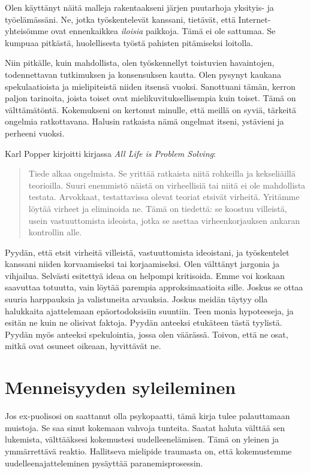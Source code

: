 Olen käyttänyt näitä malleja rakentaakseni järjen puutarhoja yksityis- ja työelämässäni. Ne, jotka työskentelevät kanssani, tietävät, että Internet-yhteisömme ovat ennenkaikkea \emph{iloisia} paikkoja. Tämä ei ole sattumaa. Se kumpuaa pitkästä, huolellisesta työstä pahisten pitämiseksi loitolla.

Niin pitkälle, kuin mahdollista, olen työskennellyt toistuvien havaintojen, todennettavan tutkimuksen ja konsensuksen kautta. Olen pysynyt kaukana spekulaatioista ja mielipiteistä niiden itsensä vuoksi. Sanottuani tämän, kerron paljon tarinoita, joista toiset ovat mielikuvituksellisempia kuin toiset. Tämä on välttämätöntä. Kokemukseni on kertonut minulle, että meillä on syviä, tärkeitä ongelmia ratkottavana. Halusin ratkaista nämä ongelmat itseni, ystävieni ja perheeni vuoksi.

Karl Popper kirjoitti kirjassa \emph{All Life is Problem Solving}:
\begin{quotation}
\noindent Tiede alkaa ongelmista. Se yrittää ratkaista niitä rohkeilla ja kekseliäillä teorioilla. Suuri enemmistö näistä on virheellisiä tai niitä ei ole mahdollista testata. Arvokkaat, testattavissa olevat teoriat etsivät virheitä. Yritämme löytää virheet ja eliminoida ne. Tämä on tiedettä: se koostuu villeistä, usein vastuuttomista ideoista, jotka se asettaa virheenkorjauksen ankaran kontrollin alle.
\end{quotation}
Pyydän, että etsit virheitä villeistä, vastuuttomista ideoistani, ja työskentelet kanssani niiden korvaamiseksi tai korjaamiseksi. Olen välttänyt jargonia ja vihjailua. Selvästi esitettyä ideaa on helpompi kritisoida. Emme voi koskaan saavuttaa totuutta, vain löytää parempia approksimaatioita sille. Joskus se ottaa suuria harppauksia ja valistuneita arvauksia. Joskus meidän täytyy olla halukkaita ajattelemaan epäortodoksisiin suuntiin. Teen monia hypoteeseja, ja esitän ne kuin ne olisivat faktoja. Pyydän anteeksi etukäteen tästä tyylistä. Pyydän myös anteeksi spekulointia, jossa olen väärässä. Toivon, että ne osat, mitkä ovat osuneet oikeaan, hyvittävät ne.

\section{Menneisyyden syleileminen}

Jos ex-puolisosi on saattanut olla psykopaatti, tämä kirja tulee palauttamaan muistoja. Se saa sinut kokemaan vahvoja tunteita. Saatat haluta välttää sen lukemista, välttääksesi kokemustesi uudelleenelämisen. Tämä on yleinen ja ymmärrettävä reaktio. Hallitseva mielipide traumasta on, että kokemustemme uudelleenajatteleminen pysäyttää paranemisprosessin.

